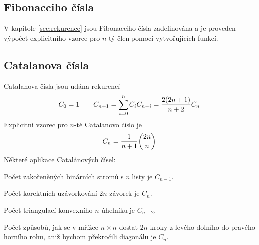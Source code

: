 \subsection{Fibonacciho čísla}

V kapitole \ref{sec:rekurence} jsou Fibonacciho čísla zadefinována a je
proveden výpočet explicitního vzorce pro $n$-tý člen pomocí vytvořujících
funkcí.

\subsection{Catalanova čísla}

Catalanova čísla jsou udána rekurencí
$$C_0 = 1\qquad C_{n+1} = \sum_{i=0}^n C_iC_{n-i} = {2(2n+1)\over n+2}C_n$$
Explicitní vzorec pro $n$-té Catalanovo číslo je
$$C_n = {1\over n+1}{2n\choose n}$$
Některé aplikace Catalánových čísel:
\begin{itemize*}
\item Počet zakořeněných binárních stromů s $n$ listy je $C_{n-1}$.
\item Počet korektních uzávorkování $2n$ závorek je $C_n$.
\item Počet triangulací konvexního $n$-úhelníku je $C_{n-2}$.
\item Počet způsobů, jak se v mřížce $n\times n$ dostat $2n$ kroky z levého dolního do pravého horního rohu, aniž bychom překročili diagonálu je $C_n$.
\end{itemize*}


